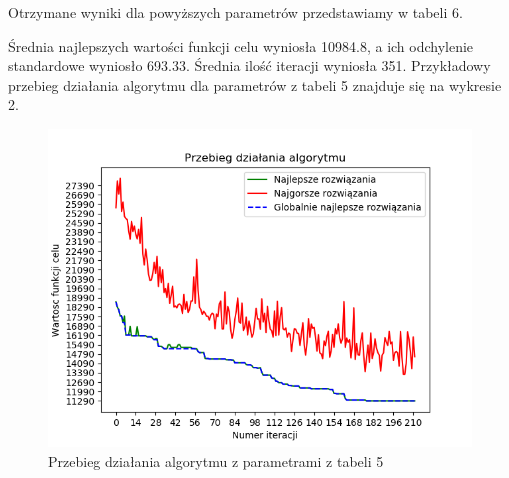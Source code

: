 \documentclass[12pt]{article}
\begin{document}
\begin{table}[H]
\caption{Początkowe parametry algorytmu}
\begin{center}
\end{center}
\end{table}
Otrzymane wyniki dla powyższych parametrów przedstawiamy w tabeli 6.
\begin{table}[H]
\caption{Otrzymane wyniki dla parametrów z tabeli 5}
\begin{center}
\end{center}
\end{table}
Średnia najlepszych wartości funkcji celu wyniosła 10984.8, a ich odchylenie standardowe wyniosło 693.33. Średnia ilość iteracji wyniosła 351. Przykładowy przebieg działania algorytmu dla parametrów z tabeli 5 znajduje się na wykresie 2.
\begin{figure}[H]
\caption{Przebieg działania algorytmu z parametrami z tabeli 5}
\includegraphics{punkt_odniesienia.png}
\end{figure}
\end{document}
